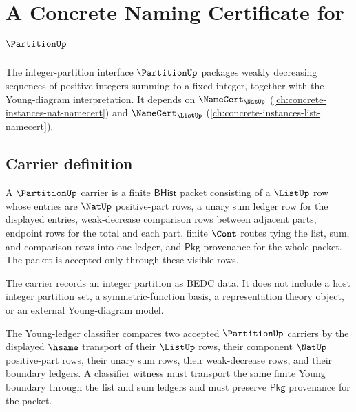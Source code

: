 \chapter{A Concrete Naming Certificate for $\PartitionUp$}
\label{ch:concrete-instances-partition-namecert}

The integer-partition interface $\PartitionUp$ packages weakly decreasing sequences of positive integers summing to a fixed integer, together with the Young-diagram interpretation. It depends on $\NameCert_{\NatUp}$ (\autoref{ch:concrete-instances-nat-namecert}) and $\NameCert_{\ListUp}$ (\autoref{ch:concrete-instances-list-namecert}).

\section{Carrier definition}
\label{sec:partition-carrier}

\begin{definition}
\label{def:partition-bhist-carrier}
A $\PartitionUp$ carrier is a finite $\mathsf{BHist}$ packet consisting of a
$\ListUp$ row whose entries are $\NatUp$ positive-part rows, a unary sum ledger
row for the displayed entries, weak-decrease comparison rows between adjacent
parts, endpoint rows for the total and each part, finite $\Cont$ routes tying
the list, sum, and comparison rows into one ledger, and $\mathsf{Pkg}$
provenance for the whole packet. The packet is accepted only through these
visible rows.

The carrier records an integer partition as BEDC data. It does not include a
host integer partition set, a symmetric-function basis, a representation
theory object, or an external Young-diagram model.
\end{definition}

\begin{definition}
\label{def:partition-young-ledger-classifier}
The Young-ledger classifier compares two accepted $\PartitionUp$ carriers by
the displayed $\hsame$ transport of their $\ListUp$ rows, their component
$\NatUp$ positive-part rows, their unary sum rows, their weak-decrease rows,
and their boundary ledgers. A classifier witness must transport the same
finite Young boundary through the list and sum ledgers and must preserve
$\mathsf{Pkg}$ provenance for the packet.
\end{definition}

